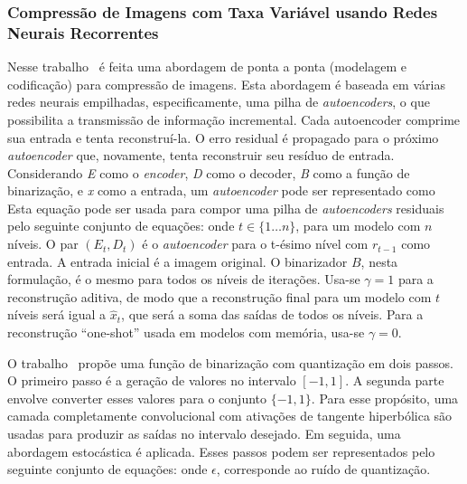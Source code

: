 \subsubsection{Compressão de Imagens com Taxa Variável usando Redes Neurais Recorrentes}
\label{variablerate}
Nesse trabalho~\cite{Variable2016Toderici} é feita uma abordagem de ponta a ponta (modelagem e codificação) para compressão de imagens. Esta abordagem é baseada em várias redes neurais empilhadas, especificamente, uma pilha de \textit{autoencoders}, o que possibilita a transmissão de informação incremental. Cada autoencoder comprime sua entrada e tenta reconstruí-la. O erro residual é propagado para o próximo \textit{autoencoder} que, novamente, tenta reconstruir seu resíduo de entrada. Considerando \textit{E} como o \textit{encoder}, \textit{D} como o decoder, \textit{B} como a função de binarização, e \textit{x} como a entrada, um \textit{autoencoder} pode ser representado como 
Esta equação pode ser usada para compor uma pilha de \textit{autoencoders} residuais pelo seguinte conjunto de equações:
onde $t \in \{1\dots n\}$, para um modelo com $n$ níveis. O par $(E_t, D_t)$ é o \textit{autoencoder} para o t-ésimo nível com $r_{t-1}$ como entrada. A entrada inicial é a imagem original. O binarizador $B$, nesta formulação, é o mesmo para todos os níveis de iterações. Usa-se $\gamma = 1$ para a reconstrução aditiva, de modo que a reconstrução final para um modelo com $t$ níveis será igual a $\hat{x}_t$, que será a soma das saídas de todos os níveis. Para a reconstrução ``one-shot'' usada em modelos com memória, usa-se $\gamma = 0$.

O trabalho~\cite{Variable2016Toderici} propõe uma função de binarização com quantização em dois passos. O primeiro passo é a geração de valores no intervalo $[-1, 1]$. A segunda parte envolve converter esses valores para o conjunto $\{-1, 1\}$. Para esse propósito, uma camada completamente convolucional com ativações de tangente hiperbólica são usadas para produzir as saídas no intervalo desejado. Em seguida, uma abordagem estocástica é aplicada. Esses passos podem ser representados pelo seguinte conjunto de equações:   onde $\epsilon$, corresponde ao ruído de quantização.
    
